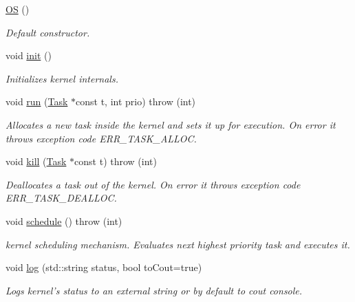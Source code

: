 \begin{DoxyCompactItemize}
\item 
\hypertarget{class_o_s_aee121bb510546f335b13791c7c7b4330}{\hyperlink{class_o_s_aee121bb510546f335b13791c7c7b4330}{O\-S} ()}\label{class_o_s_aee121bb510546f335b13791c7c7b4330}

\begin{DoxyCompactList}\small\item\em Default constructor. \end{DoxyCompactList}\item 
\hypertarget{class_o_s_a380d2d319447c4dde46ea30a004922d4}{void \hyperlink{class_o_s_a380d2d319447c4dde46ea30a004922d4}{init} ()}\label{class_o_s_a380d2d319447c4dde46ea30a004922d4}

\begin{DoxyCompactList}\small\item\em Initializes kernel internals. \end{DoxyCompactList}\item 
void \hyperlink{class_o_s_a3e5fd93afacefb94a498f0fe60fed274}{run} (\hyperlink{class_task}{Task} $\ast$const t, int prio)  throw (int)
\begin{DoxyCompactList}\small\item\em Allocates a new task inside the kernel and sets it up for execution. On error it throws exception code E\-R\-R\-\_\-\-T\-A\-S\-K\-\_\-\-A\-L\-L\-O\-C. \end{DoxyCompactList}\item 
void \hyperlink{class_o_s_a8d2cd347371d384a8b465400ffa1e1c1}{kill} (\hyperlink{class_task}{Task} $\ast$const t)  throw (int)
\begin{DoxyCompactList}\small\item\em Deallocates a task out of the kernel. On error it throws exception code E\-R\-R\-\_\-\-T\-A\-S\-K\-\_\-\-D\-E\-A\-L\-L\-O\-C. \end{DoxyCompactList}\item 
void \hyperlink{class_o_s_aecee957d7479271e941d7238a29daa82}{schedule} ()  throw (int)
\begin{DoxyCompactList}\small\item\em kernel scheduling mechanism. Evaluates next highest priority task and executes it. \end{DoxyCompactList}\item 
void \hyperlink{class_o_s_a4906875abf479d824a41e1a8fb26a227}{log} (std\-::string status, bool to\-Cout=true)
\begin{DoxyCompactList}\small\item\em Logs kernel's status to an external string or by default to cout console. \end{DoxyCompactList}\end{DoxyCompactItemize}


